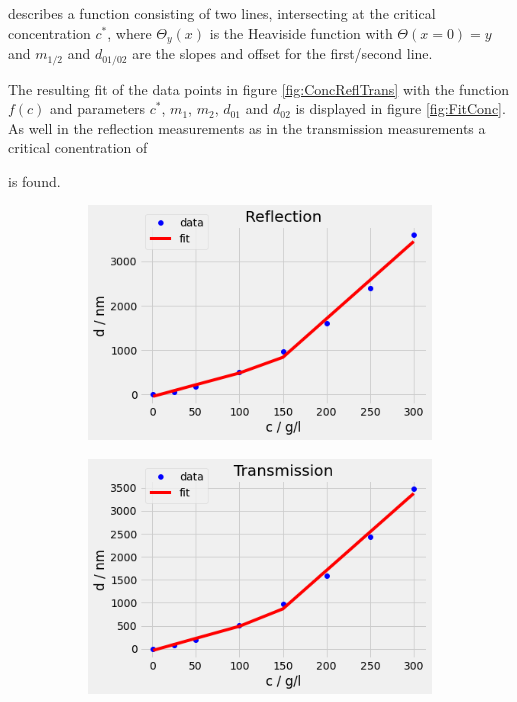 describes a function consisting of two lines, intersecting at the critical concentration $c^*$, where $\Theta_y(x)$ is the Heaviside function with $\Theta(x=0)=y$ and $m_{1/2}$ and $d_{01/02}$ are the slopes and offset for the first/second line. \par 

The resulting fit of the data points in figure \ref{fig:ConcReflTrans} with the function $f(c)$ and parameters $c^*$, $m_1$, $m_2$, $d_{01}$ and $d_{02}$ is displayed in figure \ref{fig:FitConc}. As well in the reflection measurements as in the transmission measurements a critical conentration of \par 
\centerline{} \par 
is found.

\begin{figure}[ht]
    \centering
    \begin{subfigure}[b]{0.49\textwidth}
        \centering
        \includegraphics[width = \textwidth]{Bilder/Auswertung/Concentration/ReflFit.png}
        \caption{ }
    \end{subfigure}  
    \begin{subfigure}[b]{0.49\textwidth}
        \centering
        \includegraphics[width = \textwidth]{Bilder/Auswertung/Concentration/TransFit.png}
        \caption{ }
    \end{subfigure}  



\end{figure}
